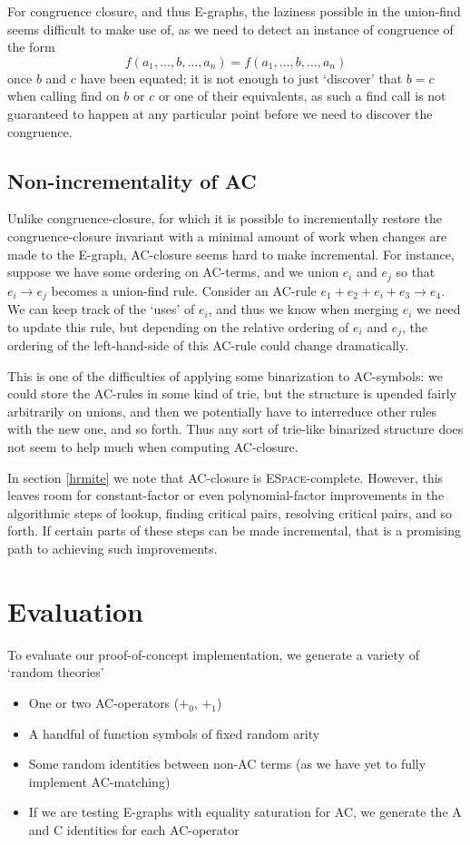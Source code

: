 \documentclass[12pt,a4paper,twoside,openright]{report}
\numberwithin{equation}{chapter}		%
\numberwithin{figure}{chapter}			%
\numberwithin{table}{chapter}			%
\theoremstyle{definition}
\theoremstyle{plain}
\begin{document}
For congruence closure, and thus E-graphs, the laziness possible in the union-find seems difficult to make use of, as we need to detect an instance of congruence of the form
$$f(a_1, \ldots, b, \ldots, a_n) = f(a_1, \ldots, b, \ldots, a_n)$$
once $b$ and $c$ have been equated; it is not enough to just `discover' that $b = c$ when calling find on $b$ or $c$ or one of their equivalents, as such a find call is not guaranteed to happen at any particular point before we need to discover the congruence.

\subsection{Non-incrementality of AC} \label{nonincac}
Unlike congruence-closure, for which it is possible to incrementally restore the congruence-closure invariant with a minimal amount of work when changes are made to the E-graph, AC-closure seems hard to make incremental. For instance, suppose we have some ordering on AC-terms, and we union $e_i$ and $e_j$ so that $e_i \rightarrow e_j$ becomes a union-find rule. Consider an AC-rule $e_1 + e_2 + e_i + e_3 \rightarrow e_4$. We can keep track of the `uses' of $e_i$, and thus we know when merging $e_i$ we need to update this rule, but depending on the relative ordering of $e_i$ and $e_j$, the ordering of the left-hand-side of this AC-rule could change dramatically.

This is one of the difficulties of applying some binarization to AC-symbols: we could store the AC-rules in some kind of trie, but the structure is upended fairly arbitrarily on unions, and then we potentially have to interreduce other rules with the new one, and so forth. Thus any sort of trie-like binarized structure does not seem to help much when computing AC-closure.

In section \ref{hrmite} we note that AC-closure is \textsc{ESpace}-complete. However, this leaves room for constant-factor or even polynomial-factor improvements in the algorithmic steps of lookup, finding critical pairs, resolving critical pairs, and so forth. If certain parts of these steps can be made incremental, that is a promising path to achieving such improvements.

\section{Evaluation} \label{evalresults}
To evaluate our proof-of-concept implementation, we generate a variety of `random theories'
\begin{itemize}
	\item One or two AC-operators ($+_0$, $+_1$)
	\item A handful of function symbols of fixed random arity
	\item Some random identities between non-AC terms (as we have yet to fully implement AC-matching)
	\item If we are testing E-graphs with equality saturation for AC, we generate the A and C identities for each AC-operator
\end{itemize}
\end{document}
